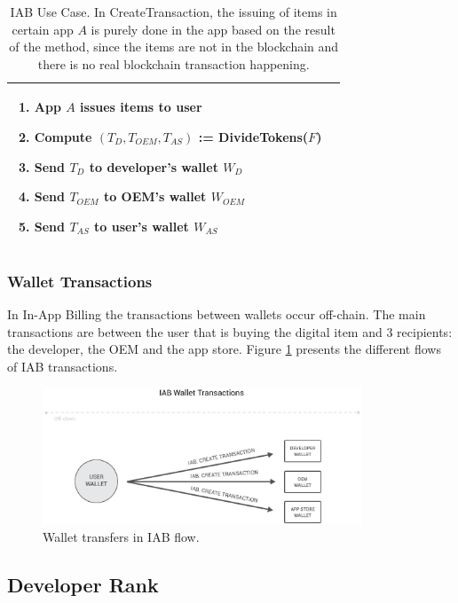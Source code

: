 \begin{table}[H]
\begin{tabular}{|p{}p{}|}
\begin{enumerate}
\begin{enumerate}
		\item App $A$ issues items to user
		\item Compute $(T_D, T_{OEM}, T_{AS})$ := \textsf{DivideTokens}($F$)
		\item Send $T_D$ to developer's wallet $W_D$
		\item Send $T_{OEM}$ to OEM's wallet $W_{OEM}$
		\item Send $T_{AS}$ to user's wallet $W_{AS}$
	\end{enumerate}
\end{enumerate} \\
\hline
\end{tabular}
\caption{IAB Use Case. In \textsf{CreateTransaction}, the issuing of items in certain app $A$ is purely done in the app based on the result of the method, since the items are not in the blockchain and there is no real blockchain transaction happening.}
\label{table: iab_protocol}
\end{table}


\subsubsection{Wallet Transactions}

In In-App Billing the transactions between wallets occur off-chain. The main transactions are between the user that is buying the digital item and 3 recipients: the developer, the OEM and the app store. Figure \ref{fig:wallet_iab_flow} presents the different flows of IAB transactions.

\begin{figure}[!ht]
\centering
\includegraphics[width=0.85\textwidth]{diagrams/wallet_transfers_iab.eps}
\caption{Wallet transfers in IAB flow.}
\label{fig:wallet_iab_flow}
\end{figure}


\subsection{Developer Rank}
\label{subsec:protocol_devrank}

